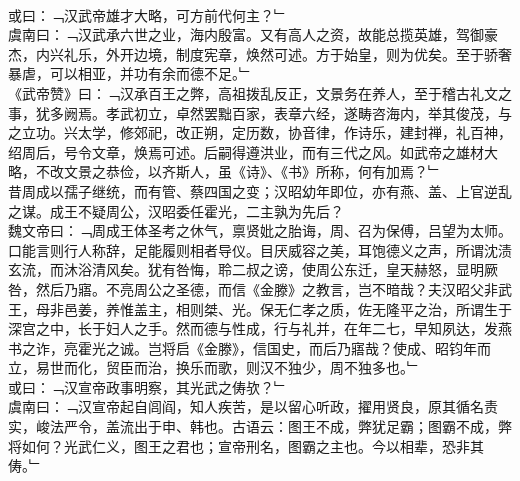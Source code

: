 \\
或曰：﹁汉武帝雄才大略，可方前代何主？﹂\\
虞南曰：﹁汉武承六世之业，海内殷富。又有高人之资，故能总揽英雄，驾御豪杰，内兴礼乐，外开边境，制度宪章，焕然可述。方于始皇，则为优矣。至于骄奢暴虐，可以相亚，并功有余而德不足。﹂\\
《武帝赞》曰：﹁汉承百王之弊，高祖拨乱反正，文景务在养人，至于稽古礼文之事，犹多阙焉。孝武初立，卓然罢黜百家，表章六经，遂畴咨海内，举其俊茂，与之立功。兴太学，修郊祀，改正朔，定历数，协音律，作诗乐，建封禅，礼百神，绍周后，号令文章，焕焉可述。后嗣得遵洪业，而有三代之风。如武帝之雄材大略，不改文景之恭俭，以齐斯人，虽《诗》、《书》所称，何有加焉？﹂
\\
昔周成以孺子继统，而有管、蔡四国之变；汉昭幼年即位，亦有燕、盖、上官逆乱之谋。成王不疑周公，汉昭委任霍光，二主孰为先后？\\
魏文帝曰：﹁周成王体圣考之休气，禀贤妣之胎诲，周、召为保傅，吕望为太师。口能言则行人称辞，足能履则相者导仪。目厌威容之美，耳饱德义之声，所谓沈渍玄流，而沐浴清风矣。犹有咎悔，聆二叔之谤，使周公东迁，皇天赫怒，显明厥咎，然后乃寤。不亮周公之圣德，而信《金滕》之教言，岂不暗哉？夫汉昭父非武王，母非邑姜，养惟盖主，相则桀、光。保无仁孝之质，佐无隆平之治，所谓生于深宫之中，长于妇人之手。然而德与性成，行与礼并，在年二七，早知夙达，发燕书之诈，亮霍光之诚。岂将启《金滕》，信国史，而后乃寤哉？使成、昭钧年而立，易世而化，贸臣而治，换乐而歌，则汉不独少，周不独多也。﹂
\\
或曰：﹁汉宣帝政事明察，其光武之俦欤？﹂\\
虞南曰：﹁汉宣帝起自闾阎，知人疾苦，是以留心听政，擢用贤良，原其循名责实，峻法严令，盖流出于申、韩也。古语云：图王不成，弊犹足霸；图霸不成，弊将如何？光武仁义，图王之君也；宣帝刑名，图霸之主也。今以相辈，恐非其俦。﹂
